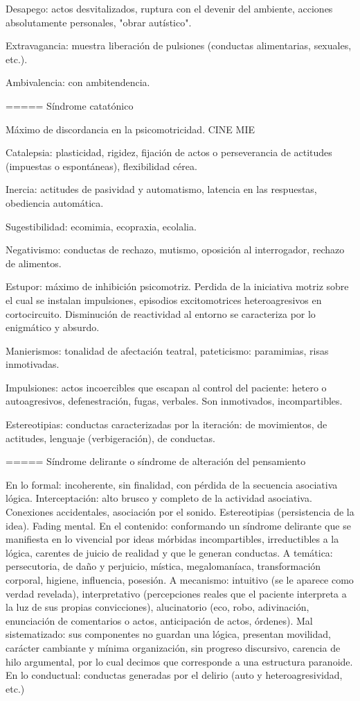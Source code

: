 \documentclass[encares.tex]{subfiles}
\begin{document}
Desapego: actos desvitalizados, ruptura con el devenir del ambiente, acciones absolutamente personales, "obrar autístico".

Extravagancia: muestra liberación de pulsiones (conductas alimentarias, sexuales, etc.).

Ambivalencia: con ambitendencia.

===== Síndrome catatónico

Máximo de discordancia en la psicomotricidad. CINE MIE

Catalepsia: plasticidad, rigidez, fijación de actos o perseverancia de actitudes (impuestas o espontáneas), flexibilidad cérea.

Inercia: actitudes de pasividad y automatismo, latencia en las respuestas, obediencia automática.

Sugestibilidad: ecomimia, ecopraxia, ecolalia.

Negativismo: conductas de rechazo, mutismo, oposición al interrogador, rechazo de alimentos.

Estupor: máximo de inhibición psicomotriz. Perdida de la iniciativa motriz sobre el cual se instalan impulsiones, episodios excitomotrices heteroagresivos en cortocircuito. Disminución de reactividad al entorno se caracteriza por lo enigmático y absurdo.

Manierismos: tonalidad de afectación teatral, pateticismo: paramimias, risas inmotivadas.

Impulsiones: actos incoercibles que escapan al control del paciente: hetero o autoagresivos, defenestración, fugas, verbales. Son inmotivados, incompartibles.

Estereotipias: conductas caracterizadas por la iteración: de movimientos, de actitudes, lenguaje (verbigeración), de conductas.

===== Síndrome delirante o síndrome de alteración del pensamiento

En lo formal: incoherente, sin finalidad, con pérdida de la secuencia asociativa lógica. Interceptación: alto brusco y completo de la actividad asociativa. Conexiones accidentales, asociación por el sonido. Estereotipias (persistencia de la idea). Fading mental. 
En el contenido: conformando un síndrome delirante que se manifiesta en lo vivencial por ideas mórbidas incompartibles, irreductibles a la lógica, carentes de juicio de realidad y que le generan conductas. 
A temática: persecutoria, de daño y perjuicio, mística, megalomaníaca, transformación corporal, higiene, influencia, posesión. 
A mecanismo: intuitivo (se le aparece como verdad revelada), interpretativo (percepciones reales que el paciente interpreta a la luz de sus propias convicciones), alucinatorio (eco, robo, adivinación, enunciación de comentarios o actos, anticipación de actos, órdenes). Mal sistematizado: sus componentes no guardan una lógica, presentan movilidad, carácter cambiante y mínima organización, sin progreso discursivo, carencia de hilo argumental, por lo cual decimos que corresponde a una estructura paranoide. En lo conductual: conductas generadas por el delirio (auto y heteroagresividad, etc.) 
\end{document}
